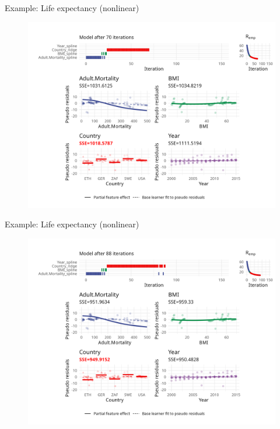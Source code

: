 \begin{frame}{Example: Life expectancy (nonlinear)}
	\begin{figure}
		\centering
		\includegraphics[width=\textwidth]{figures/cwb-anim/fig-iter-0070.png}
	\end{figure}
	\addtocounter{framenumber}{-1}
\end{frame}


\begin{frame}{Example: Life expectancy (nonlinear)}
	\begin{figure}
		\centering
		\includegraphics[width=\textwidth]{figures/cwb-anim/fig-iter-0088.png}
	\end{figure}
	\addtocounter{framenumber}{-1}
\end{frame}


